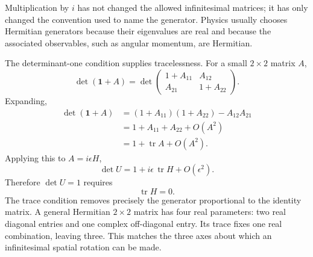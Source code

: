 Multiplication by \(i\) has not changed the allowed infinitesimal matrices; it
has only changed the convention used to name the generator. Physics usually
chooses Hermitian generators because their eigenvalues are real and because
the associated observables, such as angular momentum, are Hermitian.

The determinant-one condition supplies tracelessness. For a small \(2\times2\)
matrix \(A\),
\begin{equation}
\det(\boldsymbol 1+A)
=
\det
\begin{pmatrix}
1+A_{11}&A_{12}\\
A_{21}&1+A_{22}
\end{pmatrix}.
\end{equation}
Expanding,
\begin{align}
\det(\boldsymbol 1+A)
 &=(1+A_{11})(1+A_{22})-A_{12}A_{21}\\
 &=1+A_{11}+A_{22}+O(A^2)\\
 &=1+\operatorname{tr}A+O(A^2).
\end{align}
Applying this to \(A=i\epsilon H\),
\begin{equation}
\det U=1+i\epsilon\,\operatorname{tr}H+O(\epsilon^2).
\end{equation}
Therefore \(\det U=1\) requires
\begin{equation}
\operatorname{tr}H=0.
\end{equation}
The trace condition removes precisely the generator proportional to the
identity matrix. A general Hermitian \(2\times2\) matrix has four real
parameters: two real diagonal entries and one complex off-diagonal entry. Its
trace fixes one real combination, leaving three. This matches the three axes
about which an infinitesimal spatial rotation can be made.

